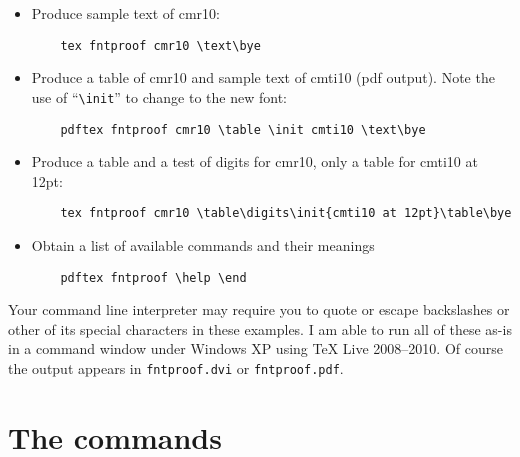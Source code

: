 \documentclass[draft]{article}
\newcommand\file[1]{\texttt{#1}}
\renewcommand\"{\verb"}
\begin{document}
\begin{itemize}
 \item  Produce sample text of cmr10:
\begin{verbatim}
    tex fntproof cmr10 \text\bye
\end{verbatim}

 \item  Produce a table of cmr10 and sample text of cmti10 (pdf output).
        Note the use of ``\"\init"'' to change to the new font:
\begin{verbatim}
    pdftex fntproof cmr10 \table \init cmti10 \text\bye
\end{verbatim}

 \item  Produce a table and a test of digits for cmr10, only a table for
        cmti10 at 12pt:
\begin{verbatim}
    tex fntproof cmr10 \table\digits\init{cmti10 at 12pt}\table\bye
\end{verbatim}

 \item  Obtain a list of available commands and their meanings
\begin{verbatim}
    pdftex fntproof \help \end
\end{verbatim}
\end{itemize}

Your command line interpreter may require you to quote or escape
backslashes or other of its special characters in these examples. I am
able to run all of these as-is in a command window under Windows XP 
using TeX Live 2008--2010. Of course the output appears in 
\file{fntproof.dvi} or \file{fntproof.pdf}.


\section{The commands}
\end{document}
